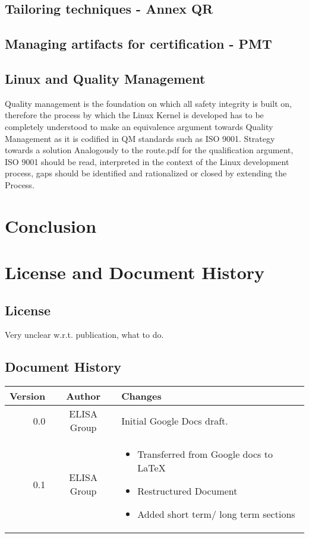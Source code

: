 \documentclass[12pt]{ElisaPaper}
\begin{document}
\subsection{Tailoring techniques - Annex QR}


\subsection{Managing artifacts for certification - PMT}



\subsection{Linux and Quality Management}
Quality management is the foundation on which all safety integrity is built on, therefore the process by which the Linux Kernel is developed has to be completely understood to make an equivalence argument towards Quality Management as it is codified in QM standards such as ISO 9001.
Strategy towards a solution
Analogously to the route.pdf for the qualification argument, ISO 9001 should be read, interpreted in the context of the Linux development process, gaps should be identified and rationalized or closed by extending the Process.

\section{Conclusion}

\section{License and Document History}
\subsection{License}
Very unclear w.r.t. publication, what to do.

\subsection{Document History}

\begin{tabular}{r|c|p{}} 
Version & Author & Changes \\
\hline
0.0 & ELISA Group & Initial Google Docs draft. \\
0.1 & ELISA Group & \begin{itemize}
	\item Transferred from Google docs to  \LaTeX
	\item Restructured Document 
	\item Added short term/ long term sections 
\end{itemize}	
\end{tabular} 	


{}

	
	
	
\end{document}
